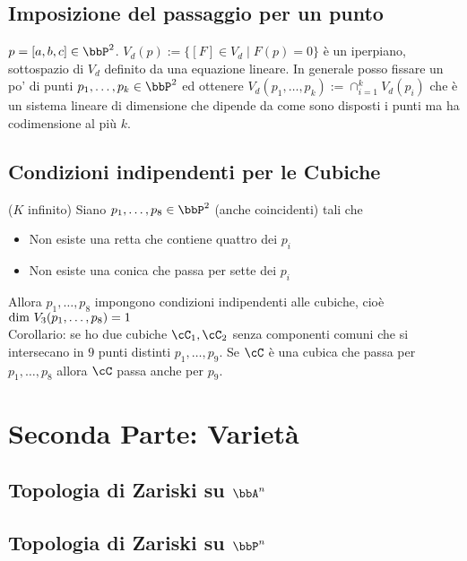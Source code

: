 \documentclass[a4paper,NoNotes,GeneralMath]{stdmdoc}
\begin{document}
	\subsection*{Imposizione del passaggio per un punto}
	$p = [a,b,c] \in \bbP^2$. $V_d (p) := \{ [F] \in V_d \mid F(p) = 0 \}$ è un iperpiano, sottospazio di $V_d$ definito da una equazione lineare. In generale posso fissare un po' di punti $p_1, \ldots, p_k \in \bbP^2$ ed ottenere $V_d(p_1, \ldots, p_k) := \cap_{i=1}^k V_d(p_i)$ che è un sistema lineare di dimensione che dipende da come sono disposti i punti ma ha codimensione al più $k$.
	
	\subsection*{Condizioni indipendenti per le Cubiche}
	($K$ infinito) Siano $p_1, \ldots, p_8 \in \bbP^2$ (anche coincidenti) tali che
	\begin{itemize}
		\item Non esiste una retta che contiene quattro dei $p_i$
		\item Non esiste una conica che passa per sette dei $p_i$
	\end{itemize}
	Allora $p_1, \ldots, p_8$ impongono condizioni indipendenti alle cubiche, cioè $\mbox{dim } V_3(p_1, \ldots, p_8) = 1$ \\
	Corollario: se ho due cubiche $\cC_1, \cC_2$ senza componenti comuni che si intersecano in $9$ punti distinti $p_1, \ldots, p_9$. Se $\cC$ è una cubica che passa per $p_1, \ldots, p_8$ allora $\cC$ passa anche per $p_9$.
	
	\section*{Seconda Parte: Varietà}
	\subsection*{Topologia di Zariski su $\bbA^n$}
	
	\subsection*{Topologia di Zariski su $\bbP^n$}
	
\end{document}
